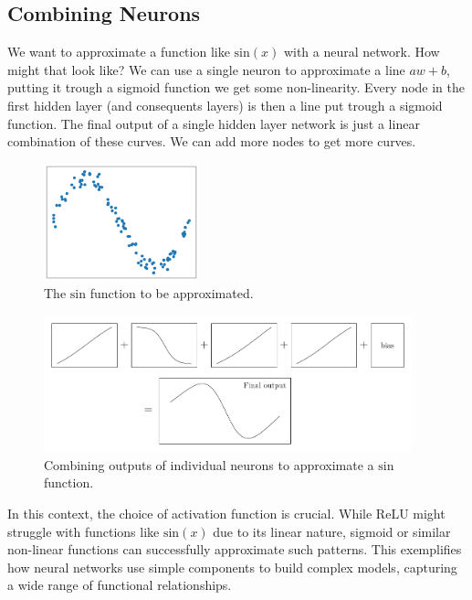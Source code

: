 \documentclass[twoside,11pt]{report}
\begin{document}
\subsection*{Combining Neurons}
\label{app:neuronscombined}


    We want to approximate a function like $\text{sin}(x)$ with a neural network. How might that look like?
    We can use a single neuron to approximate a line $a w + b$, putting it trough a sigmoid function
    we get some non-linearity. Every node in the first hidden layer (and consequents layers) is then 
    a line put trough a sigmoid function. The final output of a single hidden layer network is just
    a linear combination of these curves. We can add more nodes to get more curves. 


    \begin{figure}
        \begin{center}
            \includegraphics[width=0.4\textwidth]{../runsAndFigures/sin.png}
        \end{center}
        \caption{The $\text{sin}$ function to be approximated.}\label{fig:sin}
    \end{figure}

    \begin{figure}
        \begin{center}
            \includegraphics[width=0.95\textwidth]{tikzfigures/universal.pdf}
        \end{center}
        \caption{Combining outputs of individual neurons to approximate a $\text{sin}$ function.}\label{fig:universal}
    \end{figure}

    In this context, the choice of activation function is crucial. While ReLU might struggle 
    with functions like $\text{sin}(x)$ due to its linear nature, sigmoid or similar non-linear 
    functions can successfully approximate such patterns. This exemplifies how neural networks 
    use simple components to build complex models, capturing a wide range of functional relationships.








\vskip 0.2in

% 

\end{document}
